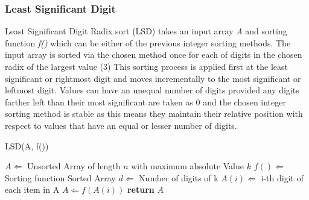 \documentclass[12pt]{article}
\begin{document}
	\subsubsection{Least Significant Digit}
	\label{ssec:lsd}
	Least Significant Digit Radix sort (LSD) takes an input array \textit{A} and sorting function \textit{f()} which can be either of the previous integer sorting methods. The input array is sorted via the chosen method once for each of digits in the chosen radix of the largest value (3) This sorting process is applied first at the least significant or rightmost digit and moves incrementally to the most significant or leftmost digit. Values can have an unequal number of digits provided any digits farther left than their most significant are taken as 0 and the chosen integer sorting method is stable as this means they maintain their relative position with respect to values that have an equal or lesser number of digits.
	
	\begin{algorithm} %
		\caption{LSD({A, f()})} %
		\label{alg3} %
		\begin{algorithmic}[1] %
			\REQUIRE $A \Leftarrow$ Unsorted Array of length $n$ with maximum absolute Value $k$
			\REQUIRE $f() \Leftarrow $Sorting function 
			\ENSURE Sorted Array
			\STATE $d \Leftarrow$ Number of digits of k 
			\STATE $A(i) \Leftarrow$ i-th digit of each item in A
				\STATE $A \Leftarrow f(A(i))$ 
			\ENDFOR
			\STATE \textbf{return} $A$
		\end{algorithmic}
	\end{algorithm}
	\pagebreak
\end{document}
